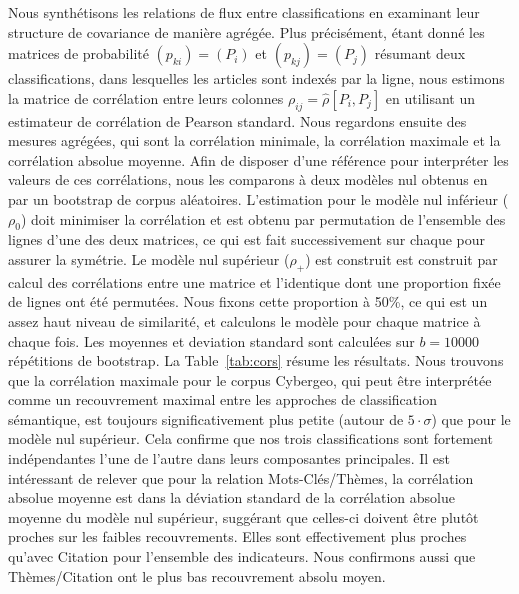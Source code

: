 {Nous synthétisons les relations de flux entre classifications en examinant leur structure de covariance de manière agrégée. Plus précisément, étant donné les matrices de probabilité $(p_{ki}) = (P_i)$ et $(p_{kj}) = (P_j)$ résumant deux classifications, dans lesquelles les articles sont indexés par la ligne, nous estimons la matrice de corrélation entre leurs colonnes $\rho_{ij} = \hat{\rho}\left[P_i,P_j\right]$ en utilisant un estimateur de corrélation de Pearson standard. Nous regardons ensuite des mesures agrégées, qui sont la corrélation minimale, la corrélation maximale et la corrélation absolue moyenne. Afin de disposer d'une référence pour interpréter les valeurs de ces corrélations, nous les comparons à deux modèles nul obtenus en par un bootstrap de corpus aléatoires. L'estimation pour le modèle nul inférieur ($\rho_0$) doit minimiser la corrélation et est obtenu par permutation de l'ensemble des lignes d'une des deux matrices, ce qui est fait successivement sur chaque pour assurer la symétrie. Le modèle nul supérieur ($\rho_+$) est construit est construit par calcul des corrélations entre une matrice et l'identique dont une proportion fixée de lignes ont été permutées. Nous fixons cette proportion à 50\%, ce qui est un assez haut niveau de similarité, et calculons le modèle pour chaque matrice à chaque fois. Les moyennes et deviation standard sont calculées sur $b=10000$ répétitions de bootstrap. La Table~\ref{tab:cors} résume les résultats. Nous trouvons que la corrélation maximale pour le corpus Cybergeo, qui peut être interprétée comme un recouvrement maximal entre les approches de classification sémantique, est toujours significativement plus petite (autour de $5\cdot \sigma$) que pour le modèle nul supérieur. Cela confirme que nos trois classifications sont fortement indépendantes l'une de l'autre dans leurs composantes principales. Il est intéressant de relever que pour la relation Mots-Clés/Thèmes, la corrélation absolue moyenne est dans la déviation standard de la corrélation absolue moyenne du modèle nul supérieur, suggérant que celles-ci doivent être plutôt proches sur les faibles recouvrements. Elles sont effectivement plus proches qu'avec Citation pour l'ensemble des indicateurs. Nous confirmons aussi que Thèmes/Citation ont le plus bas recouvrement absolu moyen.
}


